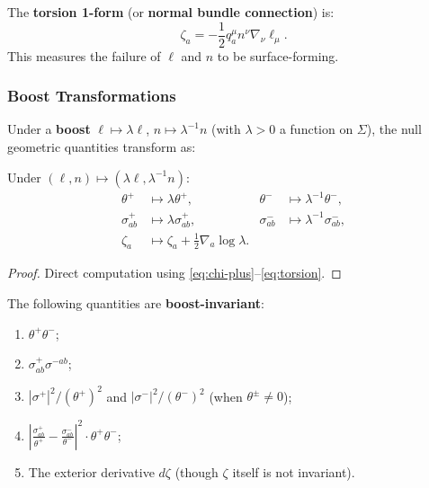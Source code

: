 \begin{definition}
\label{def:torsion}
The \textbf{torsion 1-form} (or \textbf{normal bundle connection}) is:
\begin{equation}
\zeta_a = -\frac{1}{2} q_a^\mu n^\nu \nabla_\nu \ell_\mu.
\label{eq:torsion}
\end{equation}
This measures the failure of $\ell$ and $n$ to be surface-forming.
\end{definition}

\subsubsection{Boost Transformations}

Under a \textbf{boost} $\ell \mapsto \lambda \ell$, $n \mapsto \lambda^{-1} n$ (with $\lambda > 0$ a function on $\Sigma$), the null geometric quantities transform as:

\begin{lemma}
\label{lem:boost}
Under $(\ell, n) \mapsto (\lambda\ell, \lambda^{-1}n)$:
\begin{align}
\theta^+ &\mapsto \lambda \theta^+, & \theta^- &\mapsto \lambda^{-1}\theta^-, \\
\sigma^+_{ab} &\mapsto \lambda \sigma^+_{ab}, & \sigma^-_{ab} &\mapsto \lambda^{-1}\sigma^-_{ab}, \\
\zeta_a &\mapsto \zeta_a + \frac{1}{2}\nabla_a \log\lambda.
\end{align}
\end{lemma}

\begin{proof}
Direct computation using \eqref{eq:chi-plus}--\eqref{eq:torsion}.
\end{proof}

\begin{corollary}
\label{cor:boost-invariant}
The following quantities are \textbf{boost-invariant}:
\begin{enumerate}[label=(\alph*)]
\item $\theta^+ \theta^-$;
\item $\sigma^+_{ab}\sigma^{-ab}$;
\item $|\sigma^+|^2/(\theta^+)^2$ and $|\sigma^-|^2/(\theta^-)^2$ (when $\theta^\pm \neq 0$);
\item $\displaystyle\left|\frac{\sigma^+_{ab}}{\theta^+} - \frac{\sigma^-_{ab}}{\theta^-}\right|^2 \cdot \theta^+\theta^-$;
\item The exterior derivative $d\zeta$ (though $\zeta$ itself is not invariant).
\end{enumerate}
\end{corollary}

